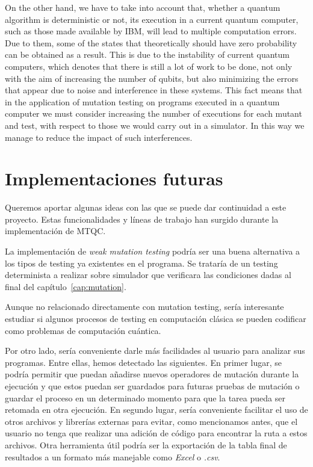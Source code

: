 On the other hand, we have to take into account that, whether a quantum algorithm is deterministic or not, its execution in a current quantum computer, such as those made available by IBM, will lead to multiple computation errors. Due to them, some of the states that theoretically should have zero probability can be obtained as a result. This is due to the instability of current quantum computers, which denotes that there is still a lot of work to be done, not only with the aim of increasing the number of qubits, but also minimizing the errors that appear due to noise and interference in these systems. This fact means that in the application of mutation testing on programs executed in a quantum computer we must consider increasing the number of executions for each mutant and test, with respect to those we would carry out in a simulator. In this way we manage to reduce the impact of such interferences.

\section{Implementaciones futuras}

Queremos aportar algunas ideas con las que se puede dar continuidad a este proyecto. Estas funcionalidades y líneas de trabajo han surgido durante la implementación de MTQC.

La implementación de \textit{weak mutation testing} podría ser una buena alternativa a los tipos de testing ya existentes en el programa. Se trataría de un testing determinista a realizar sobre simulador que verificara las condiciones dadas al final del capítulo~\ref{cap:mutation}.

Aunque no relacionado directamente con mutation testing, sería interesante estudiar si algunos procesos de testing en computación clásica se pueden codificar como problemas de computación cuántica. 

Por otro lado, sería conveniente darle más facilidades al usuario para analizar sus programas. Entre ellas, hemos detectado las siguientes. En primer lugar, se podría permitir que puedan añadirse nuevos operadores de mutación durante la ejecución y que estos puedan ser guardados para futuras pruebas de mutación o guardar el proceso en un determinado momento para que la tarea pueda ser retomada en otra ejecución. En segundo lugar, sería conveniente facilitar el uso de otros archivos y librerías externas para evitar, como mencionamos antes, que el usuario no tenga que realizar una adición de código para encontrar la ruta a estos archivos. Otra herramienta útil podría ser la exportación de la tabla final de resultados a un formato más manejable como \textit{Excel} o \textit{.csv}.

